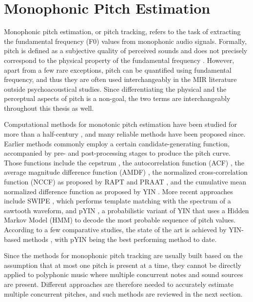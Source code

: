 \section{Monophonic Pitch Estimation}\label{sec:monophonic}

Monophonic pitch estimation, or pitch tracking, refers to the task of extracting the fundamental frequency (F0) values from monophonic audio signals.
Formally, pitch is defined as a subjective quality of perceived sounds and does not precisely correspond to the physical property of the fundamental frequency \cite{hartmann1997signals}.
However, apart from a few rare exceptions, pitch can be quantified using fundamental frequency, and thus they are often used interchangeably in the MIR literature outside psychoacoustical studies. 
Since differentiating the physical and the perceptual aspects of pitch is a non-goal, the two terms are interchangeably throughout this thesis as well.

Computational methods for monotonic pitch estimation have been studied for more than a half-century \cite{noll1967cepstrum}, and many reliable methods have been proposed since.
Earlier methods commonly employ a certain candidate-generating function, accompanied by pre- and post-processing stages to produce the pitch curve.
Those functions include the cepstrum \cite{noll1967cepstrum}, the autocorrelation function (ACF) \cite{dubnowski1976acf}, the average magnitude difference function (AMDF) \cite{ross1974amdf}, the normalized cross-correlation function (NCCF) as proposed by RAPT \cite{talkin1995rapt} and PRAAT \cite{boersma1993praat}, and the cumulative mean normalized difference function as proposed by YIN \cite{decheveigne2002yin}. More recent approaches include SWIPE \cite{camacho2008swipe}, which performs template matching with the spectrum of a sawtooth waveform, and 
pYIN \cite{mauch2014pyin}, a probabilistic variant of YIN that uses a Hidden Markov Model (HMM) to decode the most probable sequence of pitch values.
According to a few comparative studies, the state of the art is achieved by YIN-based methods \cite{von2010comparison, babacan2013comparative}, with pYIN being the best performing method to date.

Since the methods for monophonic pitch tracking are usually built based on the assumption that at most one pitch is present at a time, they cannot be directly applied to polyphonic music where multiple concurrent notes and sound sources are present.
Different approaches are therefore needed to accurately estimate multiple concurrent pitches, and such methods are reviewed in the next section.


